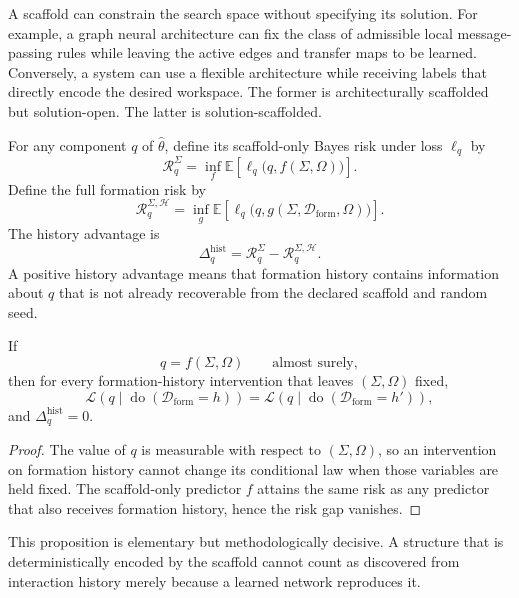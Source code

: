 
A scaffold can constrain the search space without specifying its solution.
For example, a graph neural architecture can fix the class of admissible local
message-passing rules while leaving the active edges and transfer maps to be
learned. Conversely, a system can use a flexible architecture while receiving
labels that directly encode the desired workspace. The former is
architecturally scaffolded but solution-open. The latter is solution-scaffolded.

For any component \(q\) of \(\widehat\theta\), define its scaffold-only Bayes
risk under loss \(\ell_q\) by
\[
\mathcal R_q^{\Sigma}
=
\inf_f
\mathbb E
\left[
\ell_q\bigl(q,f(\Sigma,\Omega)\bigr)
\right].
\]
Define the full formation risk by
\[
\mathcal R_q^{\Sigma,\mathcal H}
=
\inf_g
\mathbb E
\left[
\ell_q\bigl(q,g(\Sigma,\mathcal D_{\mathrm{form}},\Omega)\bigr)
\right].
\]
The history advantage is
\[
\boxed{
\Delta_q^{\mathrm{hist}}
=
\mathcal R_q^{\Sigma}
-
\mathcal R_q^{\Sigma,\mathcal H}.
}
\]
A positive history advantage means that formation history contains information
about \(q\) that is not already recoverable from the declared scaffold and
random seed.

\begin{proposition}\label{prop:scaffold-only-impossibility}
If
\[
q=f(\Sigma,\Omega)
\qquad\text{almost surely},
\]
then for every formation-history intervention that leaves \((\Sigma,\Omega)\)
fixed,
\[
\mathcal L\!\left(q\mid
\operatorname{do}(\mathcal D_{\mathrm{form}}=h)
\right)
=
\mathcal L\!\left(q\mid
\operatorname{do}(\mathcal D_{\mathrm{form}}=h')
\right),
\]
and \(\Delta_q^{\mathrm{hist}}=0\).
\end{proposition}

\begin{proof}
The value of \(q\) is measurable with respect to \((\Sigma,\Omega)\), so an
intervention on formation history cannot change its conditional law when those
variables are held fixed. The scaffold-only predictor \(f\) attains the same
risk as any predictor that also receives formation history, hence the risk gap
vanishes.
\end{proof}

This proposition is elementary but methodologically decisive. A structure
that is deterministically encoded by the scaffold cannot count as discovered
from interaction history merely because a learned network reproduces it.

